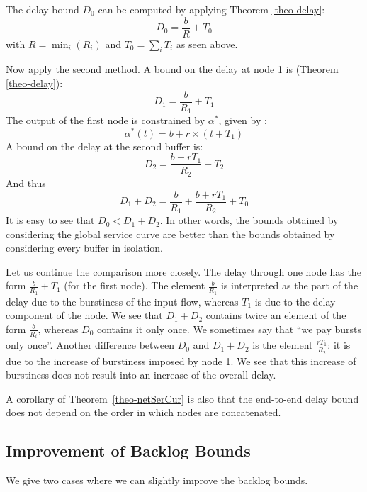 The delay bound $D_{0}$ can be computed by applying Theorem
\ref{theo-delay}:
 $$ D_{0}=\frac{b}{R} + T_{0} $$
with $R=\min_{i}(R_{i})$ and $T_{0}= \sum_{i}T_{i}$ as seen above.

Now apply the second method. A bound on the delay at node 1 is
(Theorem \ref{theo-delay}):
 $$ D_{1}= \frac{b}{R_{1}}+T_{1} $$
The output of the first node is constrained by $\alpha^*$, given
by :
 $$ \alpha^*(t) = b + r \times (t+T_{1}) $$
A bound on the delay at the second buffer is:
 $$ D_{2}=\frac{b + r T_{1}}{R _{2}}+T_{2} $$
And thus
 $$D_1 + D_2 = \frac{b}{R_{1}}+ \frac{b + r T_{1}}{R _{2}}+ T_0
 $$
It is easy to see that $D_{0}< D_{1}+D_{2}$. In other words, the
bounds obtained by considering the global service curve are better
than the bounds obtained by considering every buffer in isolation.

Let us continue the comparison more closely. The delay through one
node has the form $\frac{b}{R_{1}}+T_{1}$ (for the first node).
The element $\frac{b}{R_1}$ is interpreted as the part of the
delay due to the burstiness of the input flow, whereas $T_1$ is
due to the delay component of the node. We see that $D_{1}+D_2$
contains twice an element of the form $\frac{b}{R_i}$, whereas
$D_0$ contains it only once. We sometimes say that ``we pay bursts
only once''. Another difference between $D_0$ and $D_1+D_2$ is the
element $\frac{r T_1}{R_2}$: it is due to the increase of
burstiness imposed by node 1. We see that this increase of
burstiness does not result into an increase of the overall delay.

A corollary of Theorem~\ref{theo-netSerCur} is also that the
end-to-end delay bound does not depend on the order in which nodes
are concatenated.

\subsection{Improvement of Backlog Bounds}

We give two cases where we can slightly improve the backlog
bounds. %

